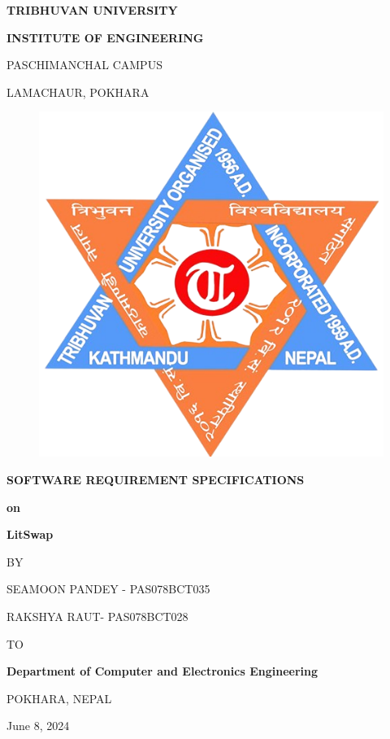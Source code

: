 \begin{titlepage}
    \thispagestyle{empty}
    \begin{center}
    
    \vspace*{\fill} %
    {\large \textbf{TRIBHUVAN UNIVERSITY
}\par}
{\large \textbf{INSTITUTE OF ENGINEERING
}\par}
\vspace{8pt}
PASCHIMANCHAL CAMPUS

LAMACHAUR, POKHARA
\vspace{24pt}

\begin{figure}[ht]
    \centering
    \includegraphics[scale=0.25]{../images/ioe-logo.png}
\end{figure}
\vspace{24pt}
{\textbf{SOFTWARE REQUIREMENT SPECIFICATIONS}\par \textbf{on} \par}
\vspace{14pt}
{\textbf{ LitSwap }\par}

\vspace{14pt}
{BY\par}
\vspace{14pt}
    
{SEAMOON PANDEY - PAS078BCT035\par}
{RAKSHYA RAUT- PAS078BCT028\par}

\vspace{24pt}
{TO\par}
\vspace{14pt}
{\textbf{Department of Computer and
Electronics Engineering}\par}
{POKHARA, NEPAL\par}
{June 8, 2024\par}

    \vspace*{\fill}

    \end{center}
\end{titlepage}